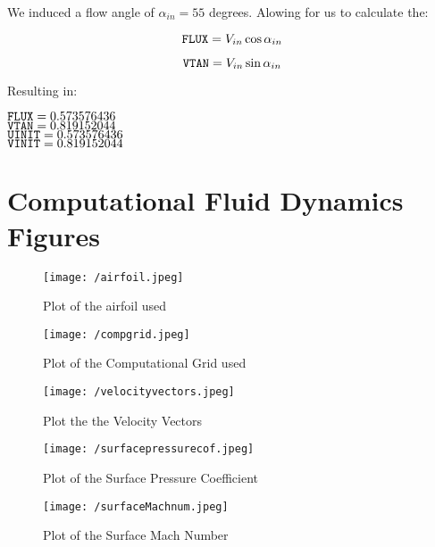 \documentclass[12pt,english]{article}
\begin{document}
We induced a flow angle of $\alpha_{in} = 55$ degrees. 
Alowing for us to calculate the:

\begin{equation}
\label{eq:FLUX}
\verb|FLUX| = V_{in} \cos{\alpha_{in}}
\end{equation}

\begin{equation}
\label{eq:VTAN}
\verb|VTAN| = V_{in} \sin{\alpha_{in}}
\end{equation}

Resulting in:

\begin{center}
  $\verb|FLUX| = 0.573576436$ \\
  $\verb|VTAN| = 0.819152044$ \\
  $\verb|UINIT| = 0.573576436$ \\
  $\verb|VINIT| = 0.819152044$ \\
\end{center}

\section{Computational Fluid Dynamics Figures}

\begin{figure}[h]
  \centering
  \texttt{[image: /airfoil.jpeg]}
  \caption{Plot of the airfoil used}
  \label{fig:Airfoil}
\end{figure}

\begin{figure}[h]
  \centering
  \texttt{[image: /compgrid.jpeg]}
  \caption{Plot of the Computational Grid used}
  \label{fig:CompGrid}
\end{figure}

\begin{figure}[h]
  \centering
  \texttt{[image: /velocityvectors.jpeg]}
  \caption{Plot the the Velocity Vectors}
  \label{fig:Vel Vectors}
\end{figure}

\begin{figure}[h]
  \centering
  \texttt{[image: /surfacepressurecof.jpeg]}
  \caption{Plot of the Surface Pressure Coefficient}
  \label{fig:Pressure Coef}
\end{figure}

\begin{figure}[h]
  \centering
  \texttt{[image: /surfaceMachnum.jpeg]}
  \caption{Plot of the Surface Mach Number}
  \label{fig:Surf Mach}
\end{figure}
\end{document}
